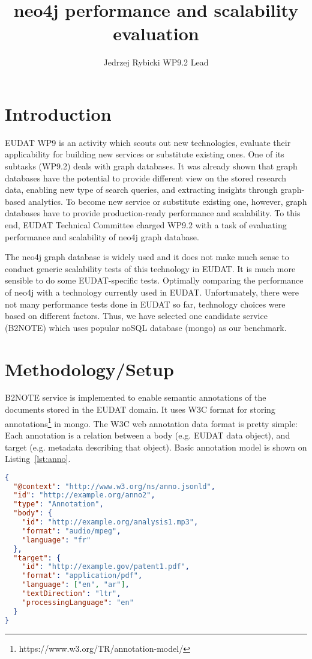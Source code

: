 \documentclass[a4paper,10pt]{article}
\title{neo4j performance and scalability evaluation}
\author{Jedrzej Rybicki WP9.2 Lead}
\begin{document}
\maketitle

\section{Introduction}
EUDAT WP9 is an activity which scouts out new technologies, evaluate their 
applicability for building new services or substitute existing ones. One of 
its subtasks (WP9.2) deals with graph databases. It was already shown that 
graph databases have the potential to provide different view on the stored 
research data, enabling new type of search queries, and extracting insights 
through graph-based analytics. To become new service or substitute existing
one, however, graph databases have to provide production-ready performance and
scalability. To this end, EUDAT Technical Committee charged WP9.2 with a task 
of evaluating performance and scalability of neo4j graph database.

The neo4j graph database is widely used and it does not make much sense to 
conduct generic scalability tests of this technology in EUDAT. It is much more 
sensible to do some EUDAT-specific tests. Optimally comparing the performance of 
neo4j with a technology currently used in EUDAT. Unfortunately, there were not 
many performance tests done in EUDAT so far, technology choices were based on 
different factors. Thus, we have selected one candidate service (B2NOTE) which 
uses popular noSQL database (mongo) as our benchmark. 

\section{Methodology/Setup}
B2NOTE service is implemented to enable semantic annotations of the documents 
stored in the EUDAT domain. It uses W3C format for storing 
annotations\footnote{https://www.w3.org/TR/annotation-model/} in mongo. The W3C 
web annotation data format is pretty simple: Each annotation is a relation 
between a body (e.g. EUDAT data object), and target (e.g. metadata describing 
that object). Basic annotation model is shown on Listing~\ref{lst:anno}.

\begin{lstlisting}[language=json,frame=single,caption=Basic W3C annotation data model,label=lst:anno]
{
  "@context": "http://www.w3.org/ns/anno.jsonld",
  "id": "http://example.org/anno2",
  "type": "Annotation",
  "body": {
    "id": "http://example.org/analysis1.mp3",
    "format": "audio/mpeg",
    "language": "fr"
  },
  "target": {
    "id": "http://example.gov/patent1.pdf",
    "format": "application/pdf",
    "language": ["en", "ar"],
    "textDirection": "ltr",
    "processingLanguage": "en"
  }
}
\end{lstlisting}
\end{document}
